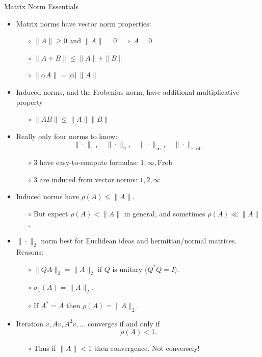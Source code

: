 \documentclass{amsart}
\newcommand{\alert}[1]{{\color{red} #1}}
\begin{document}
\Huge
\centerline{Matrix Norm Essentials}

\thispagestyle{empty}

\bigskip\bigskip\bigskip\bigskip\bigskip
\LARGE
\begin{itemize}
\setlength\itemsep{1em}
\item Matrix norms have vector norm \alert{properties}:
  \begin{itemize}
  \item[$\circ$] $\|A\| \ge 0$ and $\|A\|=0 \,\implies \,A=0$
  \item[$\circ$] $\|A+B\| \le \|A\| + \|B\|$
  \item[$\circ$] $\|\alpha A\| = |\alpha|\,\|A\|$
  \end{itemize}
\item Induced norms, and the Frobenius norm, have additional \alert{multiplicative} property
  \begin{itemize}
  \item[$\circ$] $\|A B\|\le \|A\|\|B\|$
  \end{itemize}
\item Really only \alert{four} norms to know:
  $$\|\cdot\|_1, \quad \|\cdot\|_2, \quad \|\cdot\|_\infty, \quad \|\cdot\|_{\mathrm{Frob}}$$
  \begin{itemize}
  \item[$\circ$] 3 have \alert{easy-to-compute formulas}: \quad $1,\infty,\mathrm{Frob}$
  \item[$\circ$] 3 are \alert{induced} from vector norms: \quad $1,2,\infty$
  \end{itemize}
\item Induced norms have $\rho(A)\le \|A\|$.
  \begin{itemize}
  \item[$\circ$] But \alert{expect} $\rho(A)<\|A\|$ in general, and sometimes $\rho(A)\ll\|A\|$.
  \end{itemize}
\item $\|\cdot\|_2$ norm best for \alert{Euclidean ideas} and \alert{hermitian/normal matrices}.  Reasons: 
  \begin{itemize}
  \item[$\circ$]  $\|QA\|_2 = \|A\|_2$ if $Q$ is unitary ($Q^* Q = I$).
  \item[$\circ$]  $\sigma_1(A) = \|A\|_2$.
  \item[$\circ$]  If $A^*=A$ then $\rho(A)=\|A\|_2$.
  \end{itemize}
\item \alert{Iteration} $v, Av, A^2v, \dots$ converges if and only if
    $$\rho(A)<1.$$
  \begin{itemize}
  \item[$\circ$] Thus \alert{if} $\|A\|<1$ \alert{then} convergence.  Not conversely!
  \end{itemize}
\end{itemize}
\end{document}
